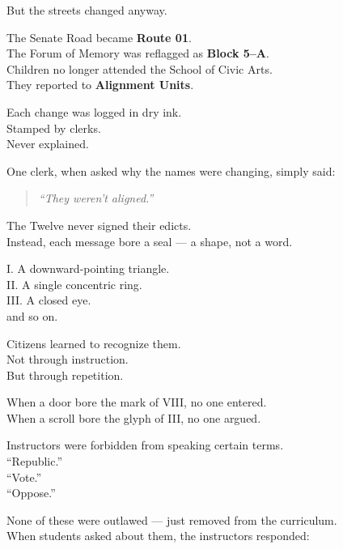 \documentclass[12pt]{article}
\begin{document}
But the streets changed anyway.

\vspace{1em}

The Senate Road became \textbf{Route 01}.\\
The Forum of Memory was reflagged as \textbf{Block 5–A}.\\
Children no longer attended the School of Civic Arts.\\
They reported to \textbf{Alignment Units}.

Each change was logged in dry ink.\\
Stamped by clerks.\\
Never explained.

\vspace{1em}

One clerk, when asked why the names were changing, simply said:

\begin{quote}
\textit{“They weren’t aligned.”}
\end{quote}

\vspace{1em}

The Twelve never signed their edicts.\\
Instead, each message bore a seal — a shape, not a word.

I. A downward-pointing triangle.\\
II. A single concentric ring.\\
III. A closed eye.\\
\textellipsis{} and so on.

Citizens learned to recognize them.\\
Not through instruction.\\
But through repetition.

When a door bore the mark of VIII, no one entered.\\
When a scroll bore the glyph of III, no one argued.

\vspace{1em}

Instructors were forbidden from speaking certain terms.\\
“Republic.”\\
“Vote.”\\
“Oppose.”

None of these were outlawed — just removed from the curriculum.\\
When students asked about them, the instructors responded:
\end{document}
